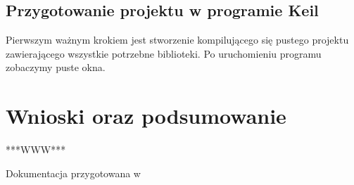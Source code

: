 \documentclass[12pt,a4paper]{article}
\begin{document}
		\subsection{Przygotowanie projektu w programie Keil}
		Pierwszym ważnym krokiem jest stworzenie kompilującego się pustego projektu zawierającego wszystkie potrzebne biblioteki. Po uruchomieniu programu zobaczymy puste okna.
	
	\section{Wnioski oraz podsumowanie}
	***WWW***

	\clearpage
	\listoffigures

	\vfill
	\hfill Dokumentacja przygotowana w \LaTeXe
\end{document}
